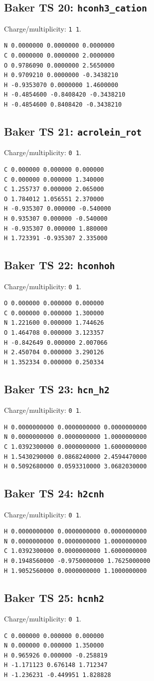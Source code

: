 \documentclass[10pt]{article}
\begin{document}
{\subsection*{Baker TS 20: \texttt{hconh3\_cation}}
Charge/multiplicity: \texttt{1 1}.
\begin{verbatim}
N 0.0000000 0.0000000 0.0000000
C 0.0000000 0.0000000 2.0000000
O 0.9786090 0.0000000 2.5650000
H 0.9709210 0.0000000 -0.3438210
H -0.9353070 0.0000000 1.4600000
H -0.4854600 -0.8408420 -0.3438210
H -0.4854600 0.8408420 -0.3438210
\end{verbatim}
\subsection*{Baker TS 21: \texttt{acrolein\_rot}}
Charge/multiplicity: \texttt{0 1}.
\begin{verbatim}
C 0.000000 0.000000 0.000000
C 0.000000 0.000000 1.340000
C 1.255737 0.000000 2.065000
O 1.784012 1.056551 2.370000
H -0.935307 0.000000 -0.540000
H 0.935307 0.000000 -0.540000
H -0.935307 0.000000 1.880000
H 1.723391 -0.935307 2.335000
\end{verbatim}
\subsection*{Baker TS 22: \texttt{hconhoh}}
Charge/multiplicity: \texttt{0 1}.
\begin{verbatim}
O 0.000000 0.000000 0.000000
C 0.000000 0.000000 1.300000
N 1.221600 0.000000 1.744626
O 1.464708 0.000000 3.123357
H -0.842649 0.000000 2.007066
H 2.450704 0.000000 3.290126
H 1.352334 0.000000 0.250334
\end{verbatim}
\subsection*{Baker TS 23: \texttt{hcn\_h2}}
Charge/multiplicity: \texttt{0 1}.
\begin{verbatim}
H 0.0000000000 0.0000000000 0.0000000000
N 0.0000000000 0.0000000000 1.0000000000
C 1.0392300000 0.0000000000 1.6000000000
H 1.5430290000 0.0868240000 2.4594470000
H 0.5092680000 0.0593310000 3.0682030000
\end{verbatim}
\subsection*{Baker TS 24: \texttt{h2cnh}}
Charge/multiplicity: \texttt{0 1}.
\begin{verbatim}
H 0.0000000000 0.0000000000 0.0000000000
N 0.0000000000 0.0000000000 1.0000000000
C 1.0392300000 0.0000000000 1.6000000000
H 0.1948560000 -0.9750000000 1.7625000000
H 1.9052560000 0.0000000000 1.1000000000
\end{verbatim}
\subsection*{Baker TS 25: \texttt{hcnh2}}
Charge/multiplicity: \texttt{0 1}.
\begin{verbatim}
C 0.000000 0.000000 0.000000
N 0.000000 0.000000 1.350000
H 0.965926 0.000000 -0.258819
H -1.171123 0.676148 1.712347
H -1.236231 -0.449951 1.828828
\end{verbatim}
}



\end{document}

